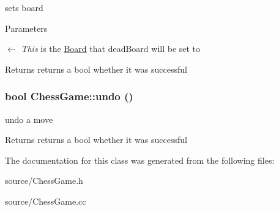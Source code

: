 sets board 
\begin{DoxyParams}{Parameters}
\item[\mbox{$\leftarrow$} {\em This}]is the \hyperlink{classBoard}{Board} that deadBoard will be set to \end{DoxyParams}
\begin{DoxyReturn}{Returns}
returns a bool whether it was successful 
\end{DoxyReturn}
\hypertarget{classChessGame_a19ce1ce19741d65888e60d741f658394}{
\subsubsection[{undo}]{\setlength{\rightskip}{0pt plus 5cm}bool ChessGame::undo ()}}
\label{classChessGame_a19ce1ce19741d65888e60d741f658394}


undo a move \begin{DoxyReturn}{Returns}
returns a bool whether it was successful 
\end{DoxyReturn}


The documentation for this class was generated from the following files:\begin{DoxyCompactItemize}
\item 
source/ChessGame.h\item 
source/ChessGame.cc\end{DoxyCompactItemize}
